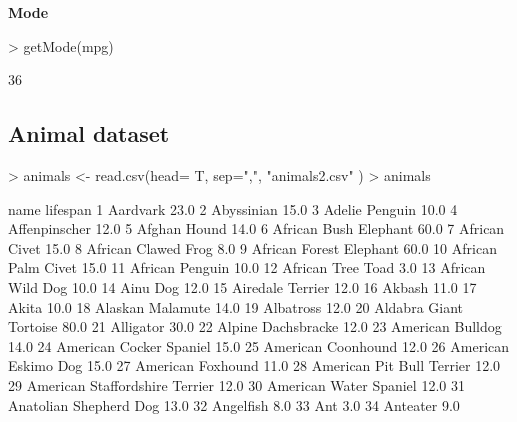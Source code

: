 \documentclass[a4paper]{article}
\begin{document}
\textbf{Mode}
\begin{Schunk}
\begin{Sinput}
> getMode(mpg)
\end{Sinput}
\begin{Soutput}
[1] 36
\end{Soutput}
\end{Schunk}


\subsection*{Animal dataset}


\begin{Schunk}
\begin{Sinput}
> animals <- read.csv(head= T, sep=",", "animals2.csv" )
> animals
\end{Sinput}
\begin{Soutput}
                              name lifespan
1                         Aardvark     23.0
2                       Abyssinian     15.0
3                   Adelie Penguin     10.0
4                    Affenpinscher     12.0
5                     Afghan Hound     14.0
6            African Bush Elephant     60.0
7                    African Civet     15.0
8              African Clawed Frog      8.0
9          African Forest Elephant     60.0
10              African Palm Civet     15.0
11                 African Penguin     10.0
12               African Tree Toad      3.0
13                African Wild Dog     10.0
14                        Ainu Dog     12.0
15               Airedale Terrier      12.0
16                          Akbash     11.0
17                           Akita     10.0
18                Alaskan Malamute     14.0
19                       Albatross     12.0
20          Aldabra Giant Tortoise     80.0
21                       Alligator     30.0
22              Alpine Dachsbracke     12.0
23                American Bulldog     14.0
24         American Cocker Spaniel     15.0
25              American Coonhound     12.0
26             American Eskimo Dog     15.0
27               American Foxhound     11.0
28       American Pit Bull Terrier     12.0
29  American Staffordshire Terrier     12.0
30          American Water Spaniel     12.0
31          Anatolian Shepherd Dog     13.0
32                       Angelfish      8.0
33                             Ant      3.0
34                        Anteater      9.0

\end{Soutput}
\end{Schunk}
\end{document}
